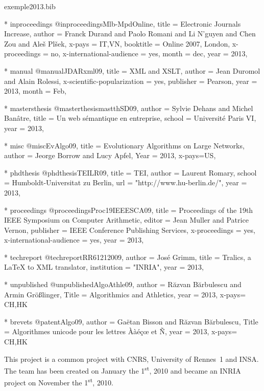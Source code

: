 \documentclass{ra2013}
\begin{document}
\begin{filecontents+}{exemple2013.bib}
{}

 
	* inproceedings
@inproceedings{Mlb-MpdOnline,
title = {Electronic Journals Increase},
author = {Franck Durand and Paolo Romani and Li N'guyen and Chen Zou and Aleš Plšek},
x-pays = {IT,VN}, 
booktitle = {Online 2007, London}, 
x-proceedings = {no}, 
x-international-audience = {yes},
month = dec,
year = 2013,
}


    * manual
@manual{JDARxml09,
title = {XML and XSLT},
author = {Jean Duromol and Alain Rolessi}, 
x-scientific-popularization = {yes}, 
publisher = {Pearson}, 
year = 2013, 
month = {Feb}, 
}


    * mastersthesis
@masterthesis{mastthSD09,
author = {Sylvie Dehans and Michel Banâtre},
title = {Un web sémantique en entreprise}, 
school = {Université Paris VI}, 
year = 2013, 
}


    * misc
@misc{EvAlgo09,
title = {Evolutionary Algorithms on Large Networks}, 
author = {Jeorge Borrow and Lucy Apfel}, 
Year = 2013, 
x-pays={US},
}


    * phdthesis
@phdthesis{TEILR09,
title = {TEI},
author = {Laurent Romary},
school = {Humboldt-Universitat zu Berlin},
url =  "http://www.hu-berlin.de/",
year = 2013, 
}


    * proceedings
@proceedings{Proc19IEEESCA09,
title = {Proceedings of the 19th IEEE Symposium on Computer Arithmetic}, 
editor = {Jean Muller and Patrice Vernon}, 
publisher = {IEEE Conference Publishing Services}, 
x-proceedings = {yes}, 
x-international-audience = {yes}, 
year = 2013, 
}


    * techreport
@techreport{RR61212009,
author = {José Grimm},
title = {Tralics, a LaTeX to XML translator}, 
institution = "INRIA", 
year = 2013, 
}


    * unpublished
@unpublished{AlgoAthle09,
author = {R{\u{a}}zvan B{\u{a}}rbulescu and Armin Größlinger},
Title = {Algorithmics and Athletics},
year = 2013,
x-pays= {CH,HK}
}


   * brevets
@patent{Algo09,
author = {Gaëtan Bisson and Răzvan Bărbulescu},
Title = {Algorithmes unicode pour les lettres Ààéçœ et Ñ},
year = 2013,
x-pays= {CH,HK}
}


\end{filecontents+}

\maketitle


\begin{moreinfo}
  This project is a common project with CNRS, University of Rennes~1 and INSA. The
  team has been created on January the 1\textsuperscript{st}, 2010 and became an
  INRIA project on November the 1\textsuperscript{st}, 2010.
\end{moreinfo}
\end{document}
